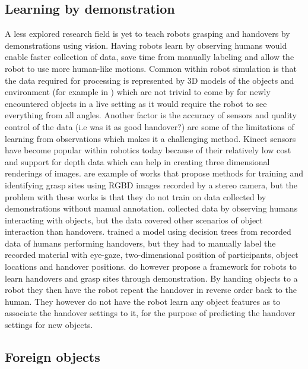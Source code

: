 \subsection{Learning by demonstration}

A less explored research field is yet to teach robots grasping and handovers by demonstrations using vision. Having robots learn by observing humans would enable faster collection of data, save time from manually labeling and allow the robot to use more human-like motions. Common within robot simulation is that the data required for processing is represented by 3D models of the objects and environment (for example in \parencite{Miller2003}) which are not trivial to come by for newly encountered objects in a live setting as it would require the robot to see everything from all angles. Another factor is the accuracy of sensors and quality control of the data (i.e was it as good handover?) are some of the limitations of learning from observations which makes it a challenging method. Kinect sensors have become popular within robotics today because of their relatively low cost and support for depth data which can help in creating three dimensional renderings of images. \parencite{Lenz2015} \parencite{Redmon2014} \parencite{Jiang2011} \parencite{Saxena2008} are example of works that propose methods for training and identifying grasp sites using RGBD images recorded by a stereo camera, but the problem with these works is that they do not train on data collected by demonstrations without manual annotation. \textcite{Chan2014} collected data by observing humans interacting with objects, but the data covered other scenarios of object interaction than handovers. \textcite{Strabala2013} trained a model using decision trees from recorded data of humans performing handovers, but they had to manually label the recorded material with eye-gaze, two-dimensional position of participants, object locations and handover positions. \textcite{Chan2015a} do however propose a framework for robots to learn handovers and grasp sites through demonstration. By handing objects to a robot they then have the robot repeat the handover in reverse order back to the human. They however do not have the robot learn any object features as to associate the handover settings to it, for the purpose of predicting the handover settings for new objects.


\subsection{Foreign objects}

